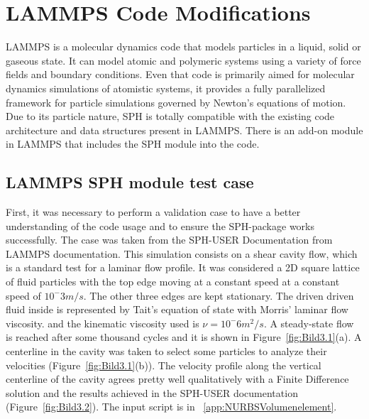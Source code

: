 
\chapter{LAMMPS Code Modifications}
\label{chap:chapter_3}

LAMMPS is a molecular dynamics code that models particles in a liquid, solid or gaseous state\cite{lammps_manual}. It can model atomic and polymeric systems using a variety of force fields and
boundary conditions. Even that code is primarily aimed for molecular dynamics simulations of atomistic systems, it provides a fully parallelized framework for particle simulations
governed by Newton's equations of motion. Due to its particle nature, SPH is totally compatible with the existing code architecture and data structures present in LAMMPS. There is 
an add-on module in LAMMPS that includes the SPH module into the code.\par

\section{LAMMPS SPH module test case}
\label{sec:section_1}

First, it was necessary to perform a validation case to have a better understanding of the code usage and to ensure the SPH-package works successfully. The case was taken from 
the SPH-USER Documentation from LAMMPS documentation\cite{ganzenmuller_implementation_2011}. This simulation consists on a shear cavity flow, which is a standard test for a laminar
flow profile. It was considered a 2D square lattice of fluid particles with the top edge moving at a constant speed at a constant speed of $10^-3m/s$. The other three edges are kept
stationary. The driven driven fluid inside is represented by Tait's equation of state \cite{neece_tait_1968} with Morris' laminar flow viscosity. and the kinematic viscosity used is
$\nu=10^-6m^2/s$. A steady-state flow is reached after some thousand cycles and it is shown in Figure~\ref{fig:Bild3.1}(a). A centerline in the cavity was taken to select some particles
to analyze their velocities (Figure~\ref{fig:Bild3.1}(b)). The velocity profile along the vertical centerline of the cavity 
agrees pretty well qualitatively with a Finite Difference solution and the results achieved in the SPH-USER documentation (Figure~\ref{fig:Bild3.2}). The input script is in ~\ref{app:NURBSVolumenelement}.


